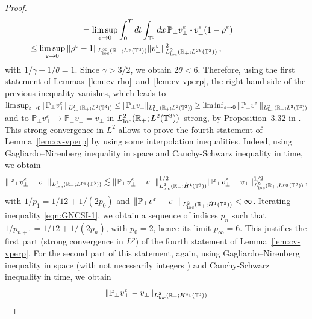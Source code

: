 \documentclass[11pt,reqno]{amsart}
\def \R{{\mathbb{R}}}
\def \T{{\mathbb{T}}}
\def \P{{\mathbb{P}}}
\begin{document}
\begin{proof}
\begin{align*}
      = \limsup_{\varepsilon \rightarrow 0} \int_0^Tdt \int_{\T^3} dx\,  \P_\perp v_\perp^\varepsilon \cdot  v_\perp^\varepsilon (1-\rho^\varepsilon) \\
      &\hspace{-8.55cm}\leq \limsup_{\varepsilon \rightarrow 0} \|\rho^\varepsilon-1\|_{L_{\rm loc}^\infty(\R_+; L^\gamma(\T^3))} \|v_\perp^\varepsilon\|_{L_{\rm loc}^2(\R_+; L^{2\theta}(\T^3))}^2\,,
    \end{align*}  
    with $1/\gamma +1/\theta=1$. Since $\gamma >3/2$, we obtain $2\theta <6$. Therefore, using the first statement of Lemmas~\ref{lem:cv-rho}~and~\ref{lem:cv-vperp}, the right-hand side of the previous inequality vanishes, which leads to $\limsup_{\varepsilon \rightarrow 0} \| \P_\perp v_\perp^\varepsilon\|_{L_{\rm loc}^2(\R_+; L^2(\T^3))}  \leq \| \P_\perp v_\perp\|_{L_{\rm loc}^2(\R_+; L^2(\T^3))} \geq \liminf_{\varepsilon \rightarrow 0} \| \P_\perp v_\perp^\varepsilon\|_{L_{\rm loc}^2(\R_+; L^2(\T^3))}$ and to $\P_\perp v_\perp^\varepsilon \rightarrow \P_\perp v_\perp=  v_\perp$ in  $L_{\rm loc}^2(\R_+; L^2(\T^3))$--strong, by Proposition~3.32 in \cite{Bre11}. This strong convergence in $L^2$ allows to prove the fourth statement of Lemma~\ref{lem:cv-vperp} by using some interpolation inequalities. Indeed, using Gagliardo--Nirenberg inequality in space  and Cauchy-Schwarz inequality in time, we obtain
    \begin{equation}
      \label{eqn:GNCSI-1}
      \|  \P_\perp v_\perp^\varepsilon -v_\perp\|_{L_{\rm loc}^2(\R_+; L^{p_1}(\T^3))}
      \lesssim  \|  \P_\perp v_\perp^\varepsilon -v_\perp\|_{L_{\rm loc}^2(\R_+; \dot H^1(\T^3))}^{1/2}
      \|  \P_\perp v_\perp^\varepsilon -v_\perp\|_{L_{\rm loc}^2(\R_+; L^{p_0}(\T^3))}^{1/2} \,, 
    \end{equation}
    with $1/p_1=1/12+1/(2p_0)$ and $\|  \P_\perp v_\perp^\varepsilon -v_\perp\|_{L_{\rm loc}^2(\R_+; \dot H^1(\T^3))} <\infty$. Iterating inequality \eqref{eqn:GNCSI-1}, we obtain a sequence of indices $p_n$ such that $1/p_{n+1}=1/12+ 1/(2p_n)$, with $p_0=2$, hence its limit $p_\infty=6$. This justifies the first part (strong convergence in $L^p$) of the fourth statement of Lemma~\ref{lem:cv-vperp}. For the second part of this statement, again, using Gagliardo--Nirenberg inequality in space   (with not necessarily integers \cite{BM18, BM19}) and  Cauchy-Schwarz inequality in time, we obtain
    \begin{equation}
      \label{eqn:GNCSI-2}
      \|  \P_\perp v_\perp^\varepsilon -v_\perp\|_{L_{\rm loc}^2(\R_+;  H^{s_1}(\T^3))}

\end{equation}
\end{proof}
\end{document}
